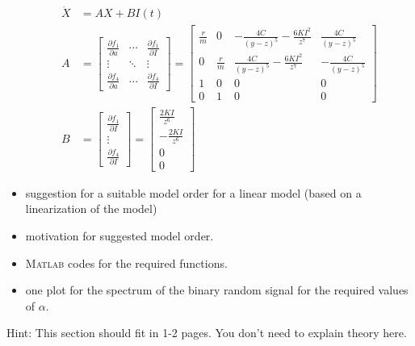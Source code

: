 \documentclass[10pt,a4paper]{article}
\begin{document}
\begin{itemize}
\begin{align*}
		\dot{X} &= A X + B I(t) \\
		A &= \begin{bmatrix} \frac{\partial f_{1}}{\partial a} & \cdots & \frac{\partial f_{1}}{\partial I} \\ \vdots & \ddots & \vdots \\ \frac{\partial f_{4}}{\partial a} & \cdots & \frac{\partial f_{4}}{\partial I} \end{bmatrix} = \begin{bmatrix} \frac{r}{m} & 0 & - \frac{4 C}{(y - z)^{5}} - \frac{6 K I^{2}}{z^{7}} & \frac{4 C}{(y - z)^{5}} \\ 0 & \frac{r}{m} & \frac{4 C}{(y - z)^{5}} - \frac{6 K I^{2}}{z^{7}} & - \frac{4 C}{(y - z)^{5}} \\ 1 & 0 & 0 & 0 \\ 0 & 1 & 0 & 0 \end{bmatrix} \\ 
		B &= \begin{bmatrix} \frac{\partial f_{1}}{\partial I} \\ \vdots \\ \frac{\partial f_{4}}{\partial I} \end{bmatrix} = \begin{bmatrix} \frac{2 K I}{z^{6}} \\ - \frac{2 K I}{z^{6}} \\ 0 \\ 0 \end{bmatrix}
	\end{align*}
    \item suggestion for a suitable model order for a linear model (based on a linearization of the model)
    \item motivation for suggested model order.
    \item \textsc{Matlab} codes for the required functions.
    
	
	
	
    \item one plot for the spectrum of the binary random signal for the required values of $\alpha$.
\end{itemize}
Hint: This section should fit in 1-2 pages. You don't need to explain theory here.

\end{document}

